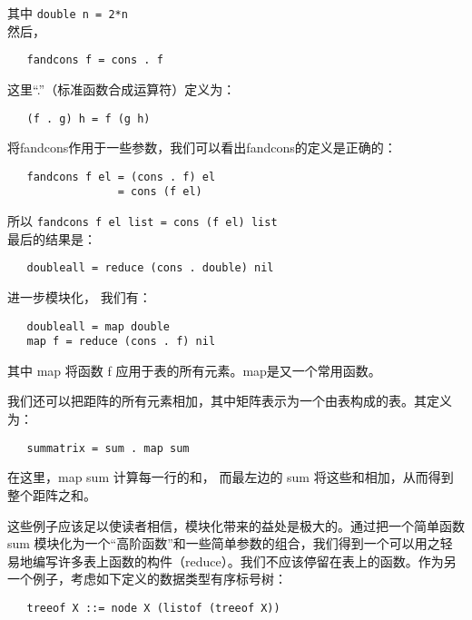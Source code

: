 \documentclass[12pt,a4paper]{article}
\begin{document}
其中 \verb"double n = 2*n"\\

然后，
 
\begin{verbatim}
   fandcons f = cons . f
\end{verbatim}
  
这里``.''（标准函数合成运算符）定义为：

\begin{verbatim}
   (f . g) h = f (g h)
\end{verbatim}

将fandcons作用于一些参数，我们可以看出fandcons的定义是正确的：

\begin{verbatim}
   fandcons f el = (cons . f) el
                 = cons (f el)
\end{verbatim}

所以 \verb"fandcons f el list = cons (f el) list"\\

最后的结果是：

\begin{verbatim}
   doubleall = reduce (cons . double) nil
\end{verbatim}

进一步模块化， 我们有：

\begin{verbatim}
   doubleall = map double
   map f = reduce (cons . f) nil
\end{verbatim}

其中 map 将函数 f 应用于表的所有元素。map是又一个常用函数。

我们还可以把距阵的所有元素相加，其中矩阵表示为一个由表构成的表。其定义为：

\begin{verbatim}
   summatrix = sum . map sum
\end{verbatim}

在这里，map sum 计算每一行的和， 而最左边的 sum 将这些和相加，从而得到整个距阵之和。

这些例子应该足以使读者相信，模块化带来的益处是极大的。通过把一个简单函数 sum 模块化为一个``高阶函数''和一些简单参数的组合，我们得到一个可以用之轻易地编写许多表上函数的构件（reduce）。我们不应该停留在表上的函数。作为另一个例子，考虑如下定义的数据类型有序标号树：

\begin{verbatim}
   treeof X ::= node X (listof (treeof X))
\end{verbatim}
\end{document}
